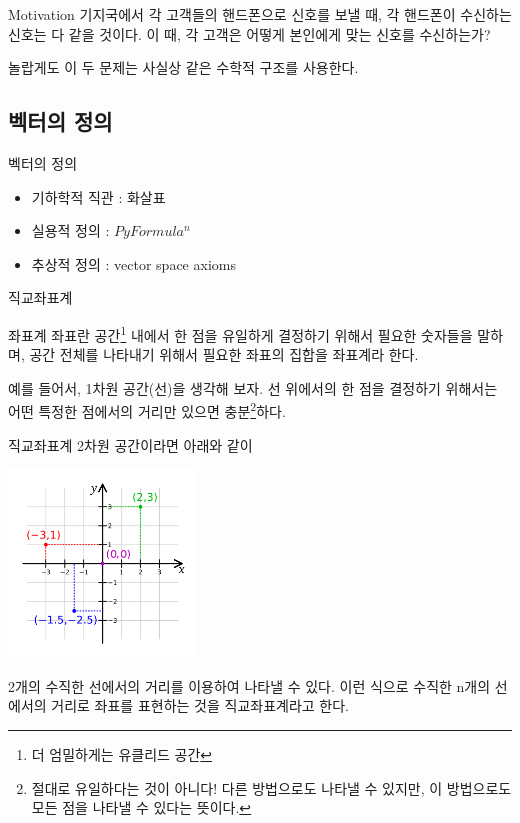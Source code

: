 \documentclass{beamer}
\begin{document}
\begin{frame}{Motivation} 
기지국에서 각 고객들의 핸드폰으로 신호를 보낼 때, 각 핸드폰이 수신하는 신호는 다 같을 것이다. 이 때, 각 고객은 어떻게 본인에게 맞는 신호를 수신하는가? 

놀랍게도 이 두 문제는 사실상 같은 수학적 구조를 사용한다. 
\end{frame}


\subsection{벡터의 정의} 

\begin{frame}{벡터의 정의} 
\begin{itemize} 
\item 기하학적 직관 : 화살표 
\item 실용적 정의 : $PyFormula^n$
\item 추상적 정의 : vector space axioms
\end{itemize}
\end{frame}

\begin{frame}{직교좌표계} 
\begin{block}{좌표계}
좌표란 공간\footnote{더 엄밀하게는 유클리드 공간} 내에서 한 점을 유일하게 결정하기 위해서 필요한 숫자들을 말하며, 공간 전체를 나타내기 위해서 필요한 좌표의 집합을 좌표계라 한다. 
\end{block}

예를 들어서, 1차원 공간(선)을 생각해 보자. 선 위에서의 한 점을 결정하기 위해서는 어떤 특정한 점에서의 거리만 있으면 충분\footnote{절대로 유일하다는 것이 아니다! 다른 방법으로도 나타낼 수 있지만, 이 방법으로도 모든 점을 나타낼 수 있다는 뜻이다.}하다. 

\end{frame}
\begin{frame}{직교좌표계} 
2차원 공간이라면 아래와 같이 

\includegraphics[height=5cm,keepaspectratio]{cartesian}

2개의 수직한 선에서의 거리를 이용하여 나타낼 수 있다. 이런 식으로 수직한 n개의 선에서의 거리로 좌표를 표현하는 것을 직교좌표계라고 한다. 
\end{frame}
\end{document}
